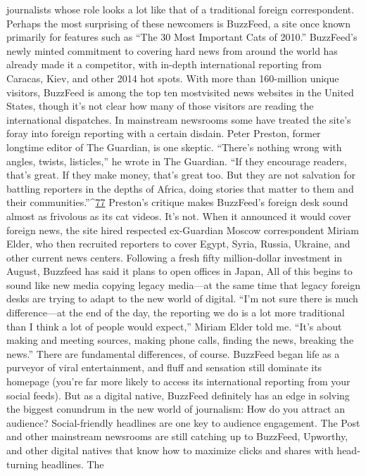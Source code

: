 journalists whose role looks a lot like that of a traditional foreign correspondent.
Perhaps the most surprising of these newcomers is BuzzFeed, a site once known
primarily for features such as ``The 30 Most Important Cats of 2010.'' BuzzFeed’s newly
minted commitment to covering hard news from around the world has already made it a
competitor, with in-depth international reporting from Caracas, Kiev, and other 2014 hot
spots. With more than 160-million unique visitors, BuzzFeed is among the top ten mostvisited
news websites in the United States, though it’s not clear how many of those
visitors are reading the international dispatches. In mainstream newsrooms some have
treated the site’s foray into foreign reporting with a certain disdain.
Peter Preston, former longtime editor of The Guardian, is one skeptic. ``There’s nothing
wrong with angles, twists, listicles,'' he wrote in The Guardian. ``If they encourage
readers, that’s great. If they make money, that’s great too. But they are not salvation for
battling reporters in the depths of Africa, doing stories that matter to them and their
communities.''^{\href{#endnotes}{77}}
Preston’s critique makes BuzzFeed’s foreign desk sound almost as frivolous as its cat
videos. It’s not. When it announced it would cover foreign news, the site hired respected
ex-Guardian Moscow correspondent Miriam Elder, who then recruited reporters to cover
Egypt, Syria, Russia, Ukraine, and other current news centers. Following a fresh fifty
million-dollar investment in August, Buzzfeed has said it plans to open offices in Japan,
All of this begins to sound like new media copying legacy media—at the same time that
legacy foreign desks are trying to adapt to the new world of digital. ``I’m not sure there is
much difference—at the end of the day, the reporting we do is a lot more traditional than
I think a lot of people would expect,'' Miriam Elder told me. ``It’s about making and
meeting sources, making phone calls, finding the news, breaking the news.''
There are fundamental differences, of course. BuzzFeed began life as a purveyor of viral
entertainment, and fluff and sensation still dominate its homepage (you’re far more likely
to access its international reporting from your social feeds). But as a digital native,
BuzzFeed definitely has an edge in solving the biggest conundrum in the new world of
journalism: How do you attract an audience?
Social-friendly headlines are one key to audience engagement. The Post and other
mainstream newsrooms are still catching up to BuzzFeed, Upworthy, and other digital
natives that know how to maximize clicks and shares with head-turning headlines. The
